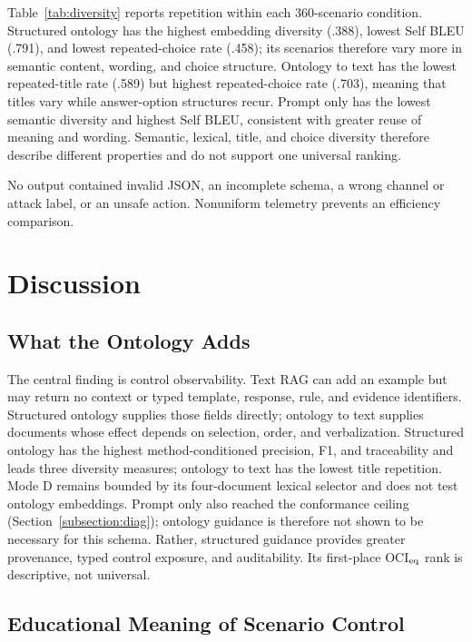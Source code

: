 \documentclass[runningheads]{llncs}
\begin{document}
Table~\ref{tab:diversity} reports repetition within each 360-scenario condition.
Structured ontology has the highest embedding diversity (.388), lowest Self BLEU
(.791), and lowest repeated-choice rate (.458); its scenarios therefore vary more
in semantic content, wording, and choice structure. Ontology to text has the
lowest repeated-title rate (.589) but highest repeated-choice rate (.703), meaning
that titles vary while answer-option structures recur. Prompt only has the lowest
semantic diversity and highest Self BLEU, consistent with greater reuse of meaning
and wording. Semantic, lexical, title, and choice diversity therefore describe
different properties and do not support one universal ranking.

No output contained invalid JSON, an incomplete schema, a wrong channel or attack
label, or an unsafe action. Nonuniform telemetry prevents an efficiency comparison.

\section{Discussion}

\subsection{What the Ontology Adds}

The central finding is control observability. Text RAG can add an example but may
return no context or typed template, response, rule, and evidence identifiers.
Structured ontology supplies those fields directly; ontology to text supplies
documents whose effect depends on selection, order, and verbalization. Structured
ontology has the highest method-conditioned precision, F1, and traceability and leads three diversity measures; ontology to text has the
lowest title repetition. Mode D remains bounded by its four-document lexical
selector and does not test ontology embeddings. Prompt only also reached the
conformance ceiling (Section~\ref{subsection:diag}); ontology guidance is therefore
not shown to be necessary for this schema. Rather, structured guidance provides
greater provenance, typed control exposure, and auditability. Its first-place OCI$_{\rm eq}$ rank is descriptive, not universal.

\subsection{Educational Meaning of Scenario Control}
\end{document}

